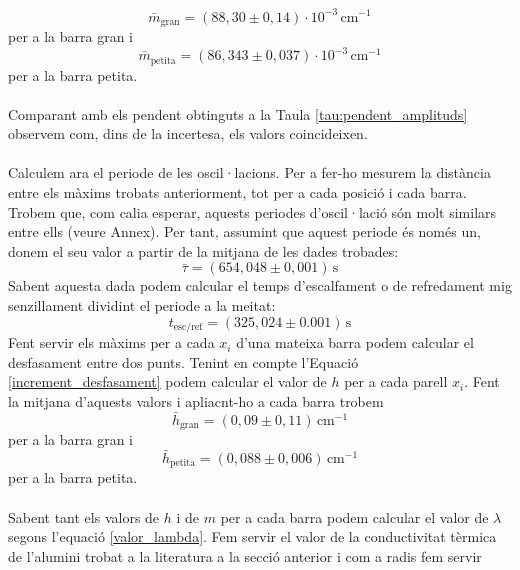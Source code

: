 \documentclass[12pt,twosides,onecolumn,openany]{article}
\begin{document}
\begin{multicols}{2}
\begin{equation*}
  \bar{m}_{\text{gran}} = (88,30\pm0,14)\cdot 10^{-3} \, \text{cm}^{-1}
\end{equation*}
per a la barra gran i
\begin{equation*}
  \bar{m}_{\text{petita}} = (86,343\pm0,037)\cdot 10^{-3} \, \text{cm}^{-1}
\end{equation*} 
per a la barra petita.\\\\
Comparant amb els pendent obtinguts a la Taula \ref{tau:pendent_amplituds} observem com, dins de la incertesa, els valors coincideixen.\\\\
Calculem ara el periode de les oscil·lacions. Per a fer-ho mesurem la distància entre els màxims trobats anteriorment, tot per a cada posició i cada barra. Trobem que, com calia esperar, aquests periodes d'oscil·lació són molt similars entre ells (veure Annex). Per tant, assumint que aquest periode és només un, donem el seu valor a partir de la mitjana de les dades trobades:
\begin{equation*}
  \bar{\tau} = (654,048\pm0,001) \, \text{s}
\end{equation*}
Sabent aquesta dada podem calcular el temps d'escalfament o de refredament mig senzillament dividint el periode a la meitat:
\begin{equation*}
  t_{\text{esc/ref}} = (325,024\pm0.001) \, \text{s}
\end{equation*}
Fent servir els màxims per a cada $x_i$ d'una mateixa barra podem calcular el desfasament entre dos punts. Tenint en compte l'Equació \eqref{increment_desfasament} podem calcular el valor de $h$ per a cada parell $x_i$. Fent la mitjana d'aquests valors i apliacnt-ho a cada barra trobem
\begin{equation*}
  \bar{h}_{\text{gran}} = (0,09\pm0,11) \, \text{cm}^{-1}
\end{equation*}
per a la barra gran i
\begin{equation*}
  \bar{h}_{\text{petita}} = (0,088\pm0,006) \, \text{cm}^{-1}
\end{equation*}
per a la barra petita.\\\\
Sabent tant els valors de $h$ i de $m$ per a cada barra podem calcular el valor de $\lambda$ segons l'equació \ref{valor_lambda}. Fem servir el valor de la conductivitat tèrmica de l'alumini trobat a la literatura a la secció anterior i com a radis fem servir
\begin{equation*}

\end{equation*}
\end{multicols}
\end{document}
